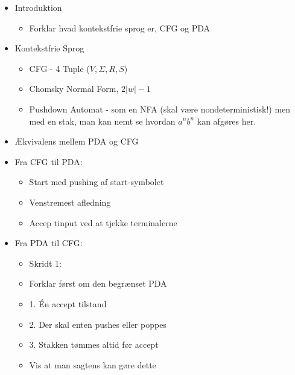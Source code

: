 \begin{itemize}
	\item Introduktion
	      \begin{itemize}
		      \item Forklar hvad kontekstfrie sprog er, CFG og PDA
	      \end{itemize}
	\item Kontekstfrie Sprog
	      \begin{itemize}
		      \item CFG - 4 Tuple ($V, \Sigma, R, S$)
		      \item Chomsky Normal Form, $2|w|-1$
		      \item Pushdown Automat - som en NFA (skal være nondeterministisk!) men med en stak, man kan nemt se hvordan $a^{n}b^{n}$ kan afgøres her.
	      \end{itemize}
	\item Ækvivalens mellem PDA og CFG
	\item Fra CFG til PDA:
	      \begin{itemize}
		      \item Start med pushing af start-symbolet
		      \item Venstremest afledning
		      \item Accep tinput ved at tjekke terminalerne
	      \end{itemize}
	\item Fra PDA til CFG:
	      \begin{itemize}
		      \item Skridt 1:
		      \item Forklar først om den begrænset PDA
		      \item 1. Én accept tilstand
		      \item 2. Der skal enten pushes eller poppes
		      \item 3. Stakken tømmes altid før accept
		      \item Vis at man sagtens kan gøre dette


\end{itemize}
\end{itemize}
